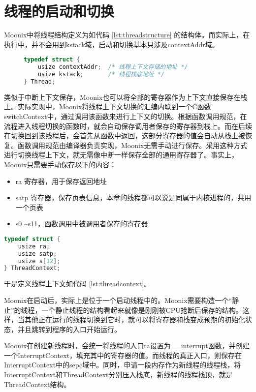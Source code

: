 \section{线程的启动和切换}

Moonix中将线程结构定义为如代码 \ref{lst:threadstructure} 的结构体。而实际上，在执行中，并不会用到kstack域，启动和切换基本只涉及contextAddr域。

\begin{figure}
\begin{lstlisting}[language={C}, caption={线程结构定义}, label={lst:threadstructure}]
typedef struct {
	usize contextAddr;  /* 线程上下文存储的地址 */
	usize kstack;       /* 线程栈底地址 */
} Thread;
\end{lstlisting}
\end{figure}

类似于中断上下文保存，Moonix也可以将全部的寄存器作为上下文直接保存在栈上。实际实现中，Moonix将线程上下文切换的汇编内联到一个C函数switchContext中，通过调用该函数来进行上下文的切换。根据函数调用规范，在流程进入线程切换的函数时，就会自动保存调用者保存的寄存器到栈上。而在后续在切换回到该线程后，会首先从函数中返回，这部分寄存器的值会自动从栈上被恢复。函数调用规范由编译器负责实现，Moonix无需手动进行保存。采用这种方式进行切换线程上下文，就无需像中断一样保存全部的通用寄存器了。事实上，Moonix只需要手动保存以下的内容：

\begin{itemize}
	\item ra 寄存器，用于保存返回地址
	\item satp 寄存器，保存页表信息，本章的线程都可以说是同属于内核进程的，共用一个页表
	\item s0 \textasciitilde s11，函数调用中被调用者保存的寄存器
\end{itemize}

\begin{lstlisting}[language={C}, caption={线程上下文定义}, label={lst:threadcontext}]
typedef struct {
	usize ra;
	usize satp;
	usize s[12];
} ThreadContext;
\end{lstlisting}

于是定义线程上下文如代码 \ref{lst:threadcontext}。

Moonix在启动后，实际上是位于一个启动线程中的。Moonix需要构造一个“静止”的线程，一个静止线程的结构看起来就像是刚刚被CPU抢断后保存的结构。这样，当其他正在运行的线程切换到它时，就可以将寄存器和栈变成预期的初始化状态，并且跳转到程序的入口开始运行。

Moonix在创建新线程时，会统一将线程的入口ra设置为\_\_interrupt函数，并创建一个InterruptContext，填充其中的寄存器的值。而线程的真正入口，则保存在InterruptContext中的sepc域中。同时，申请一段内存作为新线程的线程栈，将InterruptContext和ThreadContext分别压入栈底，新线程的线程栈顶，就是ThreadContext结构。

